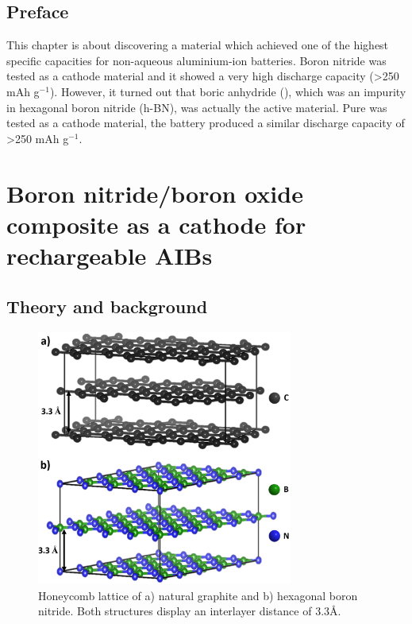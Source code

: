 \section*{Preface}
This chapter is about discovering a material which achieved one of the highest specific capacities for non-aqueous aluminium-ion batteries. Boron nitride was tested as a cathode material and it showed a very high discharge capacity (>250 mAh g$^{-1}$). However, it turned out that boric anhydride (), which was an impurity in hexagonal boron nitride (h-BN), was actually the active material. Pure  was tested as a cathode material, the battery produced a similar discharge capacity of >250 mAh g$^{-1}$. 
\newpage
\chapter{Boron nitride/boron oxide composite as a cathode for rechargeable AIBs} 
\label{BOhBN} 

\section{Theory and background}

\begin{figure}[tbh!]
\centering
\includegraphics[width=0.75\textwidth]{Figures/BOhBN/grpBNcomp}
\caption{Honeycomb lattice of a) natural graphite and b) hexagonal boron nitride. Both structures display an interlayer distance of 3.3\AA.}
\label{Figures/BOhBN:grpBNcomp}
\end{figure}

